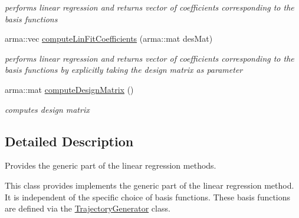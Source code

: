 \begin{DoxyCompactItemize}
\begin{DoxyCompactList}\small\item\em performs linear regression and returns vector of coefficients corresponding to the basis functions \end{DoxyCompactList}\item 
arma\-::vec \hyperlink{classkukadu_1_1GeneralFitter_ababdab99ea68030d3fa7b5cd692e4372}{compute\-Lin\-Fit\-Coefficients} (arma\-::mat des\-Mat)
\begin{DoxyCompactList}\small\item\em performs linear regression and returns vector of coefficients corresponding to the basis functions by explicitly taking the design matrix as parameter \end{DoxyCompactList}\item 
\hypertarget{classkukadu_1_1GeneralFitter_aa1b7d37f59d0c86185425ec550e6c1b0}{arma\-::mat \hyperlink{classkukadu_1_1GeneralFitter_aa1b7d37f59d0c86185425ec550e6c1b0}{compute\-Design\-Matrix} ()}\label{classkukadu_1_1GeneralFitter_aa1b7d37f59d0c86185425ec550e6c1b0}

\begin{DoxyCompactList}\small\item\em computes design matrix \end{DoxyCompactList}\end{DoxyCompactItemize}


\subsection{Detailed Description}
Provides the generic part of the linear regression methods. 

This class provides implements the generic part of the linear regression method. It is independent of the specific choice of basis functions. These basis functions are defined via the \hyperlink{classkukadu_1_1TrajectoryGenerator}{Trajectory\-Generator} class. 

